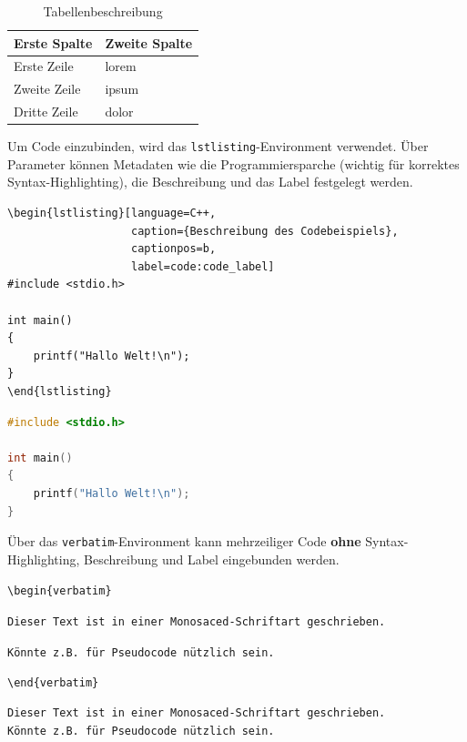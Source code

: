 \begin{table}
	\renewcommand{\arraystretch}{1.5}
	\centering
	\begin{tabular}{l|l}
		\hline
		\bfseries Erste Spalte& \bfseries Zweite Spalte \\
		\hline
		Erste Zeile & lorem \\
		Zweite Zeile & ipsum \\
		Dritte Zeile & dolor \\
		\hline
	\end{tabular}
	\caption{Tabellenbeschreibung}
	\label{table:label_der_tabelle}
\end{table}


Um Code einzubinden, wird das \verb|lstlisting|-Environment verwendet.
Über Parameter können Metadaten wie die Programmiersparche (wichtig für korrektes Syntax-Highlighting), die Beschreibung und das Label festgelegt werden.

\begin{verbatim}
\begin{lstlisting}[language=C++,
                   caption={Beschreibung des Codebeispiels},
                   captionpos=b,
                   label=code:code_label]
#include <stdio.h>

int main()
{
    printf("Hallo Welt!\n");
}
\end{lstlisting}
\end{verbatim}

\begin{lstlisting}[language=C++,
                   caption={Beschreibung des Codebeispiels},
                   captionpos=b,
                   label=code:code_label]
#include <stdio.h>

int main()
{
    printf("Hallo Welt!\n");
}
\end{lstlisting}

Über das \verb|verbatim|-Environment kann mehrzeiliger Code \textbf{ohne} Syntax-Highlighting, Beschreibung und Label eingebunden werden.

\verb|\begin{verbatim}|

\verb|Dieser Text ist in einer Monosaced-Schriftart geschrieben.|

\verb|Könnte z.B. für Pseudocode nützlich sein.|

\verb|\end{verbatim}|

\begin{verbatim}
Dieser Text ist in einer Monosaced-Schriftart geschrieben.
Könnte z.B. für Pseudocode nützlich sein.
\end{verbatim}

